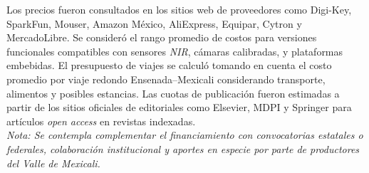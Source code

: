 Los precios fueron consultados en los sitios web de proveedores como Digi-Key, SparkFun, Mouser, Amazon México, AliExpress, Equipar, Cytron y MercadoLibre. Se consideró el rango promedio de costos para versiones funcionales compatibles con sensores \textit{NIR}, cámaras calibradas, y plataformas embebidas. El presupuesto de viajes se calculó tomando en cuenta el costo promedio por viaje redondo Ensenada–Mexicali considerando transporte, alimentos y posibles estancias. Las cuotas de publicación fueron estimadas a partir de los sitios oficiales de editoriales como Elsevier, MDPI y Springer para artículos \textit{open access} en revistas indexadas.\\

\textit{Nota: Se contempla complementar el financiamiento con convocatorias estatales o federales, colaboración institucional y aportes en especie por parte de productores del Valle de Mexicali.}